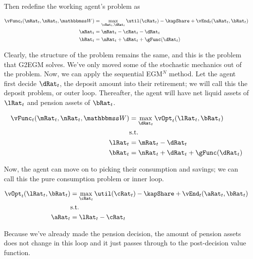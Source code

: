 \documentclass[\econtexRoot/EGMN]{subfiles}
\begin{document}
Then redefine the working agent's problem as

\begin{equation}
  \begin{split}
    \vFunc_{t}(\mRat_{t}, \nRat_{t}, \Work) & = \max_{\cRat_{t},
      \dRat_{t}} \util(\cRat_{t})  - \kapShare + \vEnd_{t}(\aRat_{t},
    \bRat_{t}) \\
    \aRat_{t} & = \mRat_{t} - \cRat_{t} - \dRat_{t} \\
    \bRat_{t} & = \nRat_{t} + \dRat_{t} + \gFunc(\dRat_{t}) \\
  \end{split}
\end{equation}

Clearly, the structure of the problem remains the same, and this is the problem
that G2EGM solves. We've only moved some
of the stochastic mechanics out of the problem. Now, we can apply the
sequential EGM$^N$ method. Let the agent first decide $\dRat_{t}$, the deposit
amount into their retirement; we will call this the deposit problem, or outer loop. Thereafter, the
agent will have net liquid assets
of $\lRat_{t}$ and pension assets of $\bRat_{t}$.

\begin{equation}
  \begin{split}
    \vFunc_{t}(\mRat_{t}, \nRat_{t}, \Work) & = \max_{\dRat_{t}}
    \vOpt_{t}(\lRat_{t}, \bRat_{t}) \\
    & \text{s.t.} \\
    \lRat_{t} & = \mRat_{t} - \dRat_{t} \\
    \bRat_{t} & = \nRat_{t} + \dRat_{t} + \gFunc(\dRat_{t})
  \end{split}
\end{equation}

Now, the agent can move on to picking their consumption and savings; we can call this
the pure consumption problem or inner loop.

\begin{equation}
  \begin{split}
    \vOpt_{t}(\lRat_{t}, \bRat_{t}) & = \max_{\cRat_{t}}
    \util(\cRat_{t}) - \kapShare  + \vEnd_{t}(\aRat_{t}, \bRat_{t}) \\
    & \text{s.t.} \\
    \aRat_{t} & = \lRat_{t} - \cRat_{t} \\
  \end{split}
\end{equation}

Because we've already made the pension decision, the amount of pension assets
does not change in this loop and it just passes through to the post-decision
value function.
\end{document}
